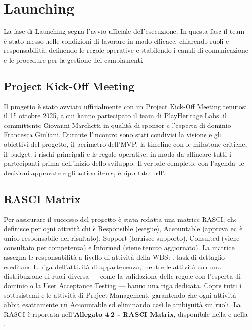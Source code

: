 \chapter{Launching}

La fase di Launching segna l'avvio ufficiale dell'esecuzione. In questa fase il team è stato messo nelle condizioni di lavorare in modo efficace, chiarendo ruoli e responsabilità, definendo le regole operative e stabilendo i canali di comunicazione e le procedure per la gestione dei cambiamenti.

\section{Project Kick-Off Meeting}

Il progetto è stato avviato ufficialmente con un Project Kick-Off Meeting tenutosi il 15 ottobre 2025, a cui hanno partecipato il team di PlayHeritage Labs, il committente Giovanni Marchetti in qualità di sponsor e l'esperta di dominio Francesca Giuliani. Durante l'incontro sono stati condivisi la visione e gli obiettivi del progetto, il perimetro dell'MVP, la timeline con le milestone critiche, il budget, i rischi principali e le regole operative, in modo da allineare tutti i partecipanti prima dell'inizio dello sviluppo. Il verbale completo, con l'agenda, le decisioni approvate e gli action items, è riportato nell'.

\section{RASCI Matrix}

Per assicurare il successo del progetto è stata redatta una matrice RASCI, che definisce per ogni attività chi è Responsible (esegue), Accountable (approva ed è unico responsabile del risultato), Support (fornisce supporto), Consulted (viene consultato per competenza) e Informed (viene tenuto aggiornato). La matrice assegna le responsabilità a livello di attività della WBS: i task di dettaglio ereditano la riga dell'attività di appartenenza, mentre le attività con una distribuzione di ruoli diversa --- come la validazione delle regole con l'esperta di dominio o la User Acceptance Testing --- hanno una riga dedicata. Copre tutti i sottosistemi e le attività di Project Management, garantendo che ogni attività abbia esattamente un Accountable ed eliminando così le ambiguità sui ruoli. La RASCI è riportata nell'\textbf{Allegato 4.2 - RASCI Matrix}, disponibile nella  e nella .

